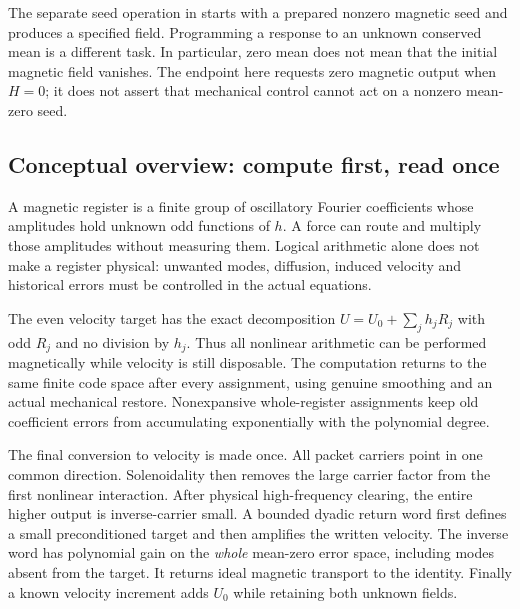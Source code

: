 \documentclass[11pt,a4paper]{amsart}
\theoremstyle{definition}
\theoremstyle{remark}
\numberwithin{equation}{section}
\begin{document}
The separate seed operation in \cite{Seed} starts with a prepared nonzero
magnetic seed and produces a specified field. Programming a response to an
unknown conserved mean is a different task. In particular, zero mean does
not mean that the initial magnetic field vanishes. The endpoint here requests
zero magnetic output when $H=0$; it does not assert that mechanical control
cannot act on a nonzero mean-zero seed.

\subsection{Conceptual overview: compute first, read once}
A magnetic register is a finite group of oscillatory Fourier coefficients
whose amplitudes hold unknown odd functions of $h$. A force can route and
multiply those amplitudes without measuring them. Logical arithmetic alone
does not make a register physical: unwanted modes, diffusion, induced
velocity and historical errors must be controlled in the actual equations.

The even velocity target has the exact decomposition
$U=U_0+\sum_jh_jR_j$ with odd $R_j$ and no division by $h_j$.
Thus all nonlinear arithmetic can be performed magnetically while velocity
is still disposable. The computation returns to the same finite code space
after every assignment, using genuine smoothing and an actual mechanical
restore. Nonexpansive whole-register assignments keep old coefficient errors
from accumulating exponentially with the polynomial degree.

The final conversion to velocity is made once. All packet carriers point in
one common direction. Solenoidality then removes the large carrier factor
from the first nonlinear interaction. After physical high-frequency clearing,
the entire higher output is inverse-carrier small. A bounded dyadic return
word first defines a small preconditioned target and then amplifies the
written velocity. The inverse word has polynomial gain on the \emph{whole}
mean-zero error space, including modes absent from the target. It returns
ideal magnetic transport to the identity. Finally a known velocity increment
adds $U_0$ while retaining both unknown fields.
\end{document}

